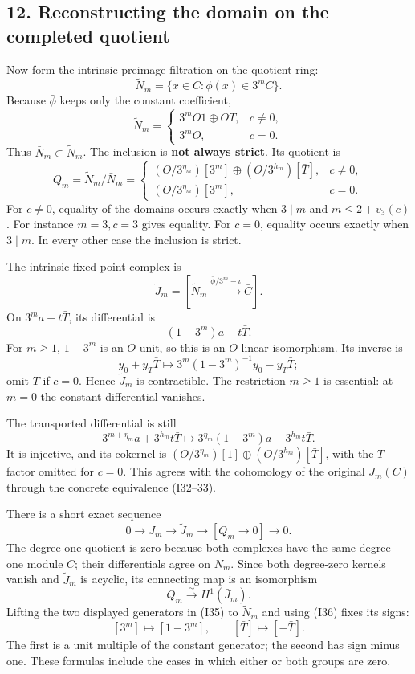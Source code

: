 \documentclass[
  10pt,
]{article}
\begin{document}
\subsection{12. Reconstructing the domain on the completed
quotient}\label{reconstructing-the-domain-on-the-completed-quotient}

Now form the intrinsic preimage filtration on the quotient ring: \[
\widetilde N_m=\{x\in\bar C:
\bar\phi(x)\in3^m\bar C\}.
\] Because \(\bar\phi\) keeps only the constant coefficient, \[
\widetilde N_m=
\begin{cases}
3^mO1\oplus O\bar T,&c\ne0,\\
3^mO,&c=0.
\end{cases} \tag{I34}
\] Thus \(\bar N_m\subset\widetilde N_m\). The inclusion is \textbf{not
always strict}. Its quotient is \[
Q_m=\widetilde N_m/\bar N_m=
\begin{cases}
(O/3^{\eta_m})[3^m]\oplus(O/3^{h_m})[\bar T],&c\ne0,\\
(O/3^{\eta_m})[3^m],&c=0.
\end{cases} \tag{I35}
\] For \(c\ne0\), equality of the domains occurs exactly when
\(3\mid m\) and \(m\le2+v_3(c)\). For instance \(m=3,c=3\) gives
equality. For \(c=0\), equality occurs exactly when \(3\mid m\). In
every other case the inclusion is strict.

The intrinsic fixed-point complex is \[
\widetilde J_m=
[\widetilde N_m\xrightarrow{\bar\phi/3^m-\iota}\bar C].
\] On \(3^ma+t\bar T\), its differential is \[
(1-3^m)a-t\bar T. \tag{I36}
\] For \(m\ge1\), \(1-3^m\) is an \(O\)-unit, so this is an \(O\)-linear
isomorphism. Its inverse is \[
y_0+y_T\bar T\longmapsto
3^m(1-3^m)^{-1}y_0-y_T\bar T;
\] omit \(T\) if \(c=0\). Hence \(\widetilde J_m\) is contractible. The
restriction \(m\ge1\) is essential: at \(m=0\) the constant differential
vanishes.

The transported differential is still \[
3^{m+\eta_m}a+3^{h_m}t\bar T
\longmapsto3^{\eta_m}(1-3^m)a-3^{h_m}t\bar T. \tag{I37}
\] It is injective, and its cokernel is
\((O/3^{\eta_m})[1]\oplus(O/3^{h_m})[\bar T]\), with the \(T\) factor
omitted for \(c=0\). This agrees with the cohomology of the original
\(J_m(C)\) through the concrete equivalence (I32--33).

There is a short exact sequence \[
0\to\bar J_m\to\widetilde J_m
\to[Q_m\to0]\to0. \tag{I38}
\] The degree-one quotient is zero because both complexes have the same
degree-one module \(\bar C\); their differentials agree on \(\bar N_m\).
Since both degree-zero kernels vanish and \(\widetilde J_m\) is acyclic,
its connecting map is an isomorphism \[
Q_m\xrightarrow{\sim}H^1(\bar J_m).
\] Lifting the two displayed generators in (I35) to \(\widetilde N_m\)
and using (I36) fixes its signs: \[
[3^m]\longmapsto[1-3^m],\qquad
[\bar T]\longmapsto[-\bar T]. \tag{I39}
\] The first is a unit multiple of the constant generator; the second
has sign minus one. These formulas include the cases in which either or
both groups are zero.
\end{document}
